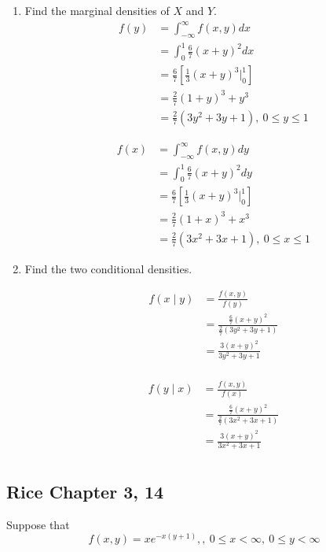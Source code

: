 \documentclass{tufte-book}
\theoremstyle{mytheoremstyle}
\theoremstyle{mylemstyle}
\theoremstyle{mydefstyle}
\begin{document}
\begin{enumerate}
\item Find the marginal densities of $X$ and $Y$.
\begin{align*}
f(y) &= \int_{-\infty}^\infty f(x,y)dx\\
&=\int_{0}^1 \frac{6}{7}(x+y)^2dx\\
&=\frac{6}{7}[\frac{1}{3}(x+y)^3\Big|_0^1]\\
&=\frac{2}{7}(1+y)^3+y^3\\
&=\frac{2}{7}(3y^2+3y+1) ,\ 0 \leq y \leq 1
\end{align*}

\begin{align*}
f(x) &= \int_{-\infty}^\infty f(x,y)dy\\
&=\int_{0}^1 \frac{6}{7}(x+y)^2dy\\
&=\frac{6}{7}[\frac{1}{3}(x+y)^3\Big|_0^1]\\
&=\frac{2}{7}(1+x)^3+x^3\\
&=\frac{2}{7}(3x^2+3x+1) ,\ 0 \leq x \leq 1
\end{align*}

\item Find the two conditional densities.

\begin{align*}
f(x\mid y) &= \frac{f(x,y)}{f(y)}\\
&=\frac{\frac{6}{7}(x+y)^2}{\frac{2}{7}(3y^2+3y+1)}\\
&=\frac{3(x+y)^2}{3y^2+3y+1}\\
\end{align*}

\begin{align*}
f(y\mid x) &= \frac{f(x,y)}{f(x)}\\
&=\frac{\frac{6}{7}(x+y)^2}{\frac{2}{7}(3x^2+3x+1)}\\
&=\frac{3(x+y)^2}{3x^2+3x+1}\\
\end{align*}
\end{enumerate}

\subsection{Rice Chapter 3, 14}

Suppose that
\[f(x,y)=xe^{-x(y+1)}, ,\ 0\leq x <\infty ,\ 0\leq y <\infty \]
\end{document}
